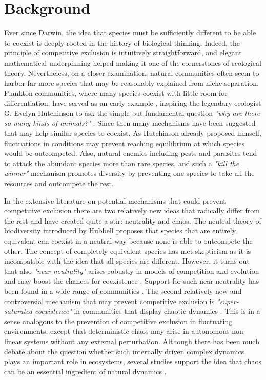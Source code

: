 \section{Background}
\label{sec:Background} 
Ever since Darwin, the idea that species must be sufficiently different to be able to coexist is deeply rooted in the history of biological thinking. Indeed, the principle of competitive exclusion is intuitively straightforward, and elegant mathematical underpinning\cite{MacArthur} helped making it one of the cornerstones of ecological theory. Nevertheless, on a closer examination, natural communities often seem to harbor far more species that may be reasonably explained from niche separation. Plankton communities, where many species coexist with little room for differentiation, have served as an early example \cite{Hutchinson, Hutchinson1961}, inspiring the legendary ecologist G. Evelyn Hutchinson to ask the simple but fundamental question \textit{"why are there so many kinds of animals?"} \cite{Hutchinson1961}. Since then many mechanisms have been suggested that may help similar species to coexist. As Hutchinson already proposed himself, fluctuations in conditions may prevent reaching equilibrium at which species would be outcompeted. Also, natural enemies including pests and parasites tend to attack the abundant species more than rare species, and such a \textit{"kill the winner"}\cite{Winter2010} mechanism promotes diversity by preventing one species to take all the resources and outcompete the rest.

In the extensive literature on potential mechanisms that could prevent competitive exclusion there are two relatively new ideas that radically differ from the rest and have created quite a stir: neutrality and chaos. The neutral theory of biodiversity introduced by Hubbell \cite{Hubbell2001} proposes that species that are entirely equivalent can coexist in a neutral way because none is able to outcompete the other. The concept of completely equivalent species has met skepticism as it is incompatible with the idea that all species are different. However, it turns out that also \textit{"near-neutrality"} arises robustly in models of competition and evolution and may boost the chances for coexistence \cite{Scheffer2006, Scheffer2018, Fort2009, Fort2010}. Support for such near-neutrality has been found in a wide range of communities \cite{Scheffer2006, Vergnon2013, Scheffera, Segura2013, Vergnon2012}. The second relatively new and controversial mechanism that may prevent competitive exclusion is \textit{"super-saturated coexistence"} in communities that display chaotic dynamics \cite{Huisman1999}. This is in a sense analogous to the prevention of competitive exclusion in fluctuating environments, except that deterministic chaos may arise in autonomous non-linear systems without any external perturbation. Although there has been much debate about the question whether such internally driven complex dynamics plays an important role in ecosystems, several studies support the idea that chaos can be an essential ingredient of natural dynamics \cite{Huisman1999, Beninca2008, Dakos2009b}.

